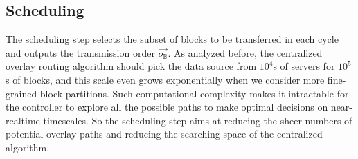 

\subsection{Scheduling}
\label{subsec:logic:scheduling}

The scheduling step
selects the subset of blocks to be transferred in each cycle and
outputs the transmission order $\overrightarrow{o_\mathbb{B}}$. As analyzed before, the centralized overlay routing algorithm should pick the data source from $10^4$s of servers for $10^5$s of blocks, and this scale even grows exponentially when we consider more fine-grained block partitions. Such computational complexity makes it intractable for the controller to explore all the possible paths to make optimal decisions on near-realtime timescales. So the scheduling step aims at reducing the sheer numbers of potential overlay paths and reducing the searching space of the centralized algorithm.

